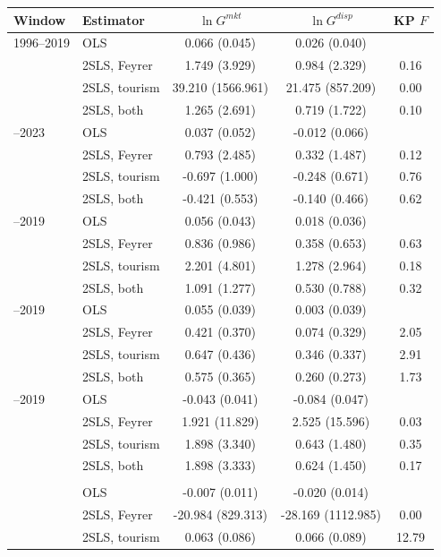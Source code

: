 \begin{tabular}{llccc}
\toprule
Window & Estimator & $\ln G^{mkt}$ & $\ln G^{disp}$ & KP $F$ \\
\midrule
1996--2019 & OLS & 0.066 (0.045) & 0.026 (0.040) &  \\
 & 2SLS, Feyrer & 1.749 (3.929) & 0.984 (2.329) & 0.16 \\
 & 2SLS, tourism & 39.210 (1566.961) & 21.475 (857.209) & 0.00 \\
 & 2SLS, both & 1.265 (2.691) & 0.719 (1.722) & 0.10 \\
\addlinespace
1996--2023 & OLS & 0.037 (0.052) & -0.012 (0.066) &  \\
 & 2SLS, Feyrer & 0.793 (2.485) & 0.332 (1.487) & 0.12 \\
 & 2SLS, tourism & -0.697 (1.000) & -0.248 (0.671) & 0.76 \\
 & 2SLS, both & -0.421 (0.553) & -0.140 (0.466) & 0.62 \\
\addlinespace
2000--2019 & OLS & 0.056 (0.043) & 0.018 (0.036) &  \\
 & 2SLS, Feyrer & 0.836 (0.986) & 0.358 (0.653) & 0.63 \\
 & 2SLS, tourism & 2.201 (4.801) & 1.278 (2.964) & 0.18 \\
 & 2SLS, both & 1.091 (1.277) & 0.530 (0.788) & 0.32 \\
\addlinespace
2005--2019 & OLS & 0.055 (0.039) & 0.003 (0.039) &  \\
 & 2SLS, Feyrer & 0.421 (0.370) & 0.074 (0.329) & 2.05 \\
 & 2SLS, tourism & 0.647 (0.436) & 0.346 (0.337) & 2.91 \\
 & 2SLS, both & 0.575 (0.365) & 0.260 (0.273) & 1.73 \\
\addlinespace
2010--2019 & OLS & -0.043 (0.041) & -0.084\sym{*} (0.047) &  \\
 & 2SLS, Feyrer & 1.921 (11.829) & 2.525 (15.596) & 0.03 \\
 & 2SLS, tourism & 1.898 (3.340) & 0.643 (1.480) & 0.35 \\
 & 2SLS, both & 1.898 (3.333) & 0.624 (1.450) & 0.17 \\
\addlinespace\multicolumn{5}{l}{\emph{Stacked five-year differences}}\\
 & OLS & -0.007 (0.011) & -0.020 (0.014) &  \\
 & 2SLS, Feyrer & -20.984 (829.313) & -28.169 (1112.985) & 0.00 \\
 & 2SLS, tourism & 0.063 (0.086) & 0.066 (0.089) & 12.79 \\
\bottomrule
\end{tabular}
